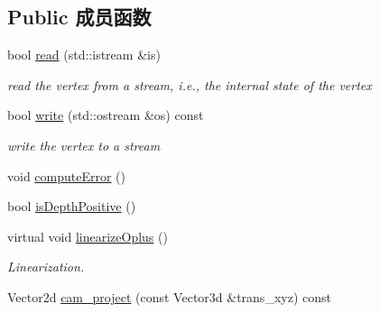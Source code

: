 \subsection*{Public 成员函数}
\begin{DoxyCompactItemize}
\item 
\hypertarget{classg2o_1_1EdgeSE3ProjectXYZOnlyPose_a28994ddf2cab7b61566ce55ad4b43388}{bool \hyperlink{classg2o_1_1EdgeSE3ProjectXYZOnlyPose_a28994ddf2cab7b61566ce55ad4b43388}{read} (std\-::istream \&is)}\label{classg2o_1_1EdgeSE3ProjectXYZOnlyPose_a28994ddf2cab7b61566ce55ad4b43388}

\begin{DoxyCompactList}\small\item\em read the vertex from a stream, i.\-e., the internal state of the vertex \end{DoxyCompactList}\item 
\hypertarget{classg2o_1_1EdgeSE3ProjectXYZOnlyPose_a5bf685170d6b17908b2a70ccc7e40904}{bool \hyperlink{classg2o_1_1EdgeSE3ProjectXYZOnlyPose_a5bf685170d6b17908b2a70ccc7e40904}{write} (std\-::ostream \&os) const }\label{classg2o_1_1EdgeSE3ProjectXYZOnlyPose_a5bf685170d6b17908b2a70ccc7e40904}

\begin{DoxyCompactList}\small\item\em write the vertex to a stream \end{DoxyCompactList}\item 
void \hyperlink{classg2o_1_1EdgeSE3ProjectXYZOnlyPose_a6752098d3322d30e43a6a3a668a3b009}{compute\-Error} ()
\item 
bool \hyperlink{classg2o_1_1EdgeSE3ProjectXYZOnlyPose_abd6f619de5af8855c8ee21fcfad51c9e}{is\-Depth\-Positive} ()
\item 
virtual void \hyperlink{classg2o_1_1EdgeSE3ProjectXYZOnlyPose_abe6d775aade1277786274c328aa2c38b}{linearize\-Oplus} ()
\begin{DoxyCompactList}\small\item\em Linearization. \end{DoxyCompactList}\item 
Vector2d \hyperlink{classg2o_1_1EdgeSE3ProjectXYZOnlyPose_a28af528a4bf0f76988896fc320ba6a64}{cam\-\_\-project} (const Vector3d \&trans\-\_\-xyz) const 
\end{DoxyCompactItemize}
